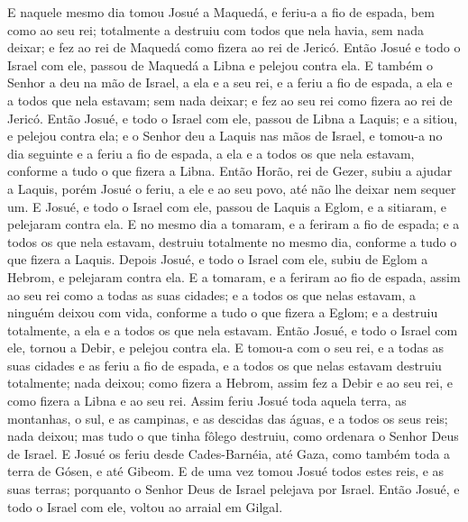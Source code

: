 E naquele mesmo dia tomou Josué a Maquedá, e feriu-a a fio de
espada, bem como ao seu rei; totalmente a destruiu com todos que
nela havia, sem nada deixar; e fez ao rei de Maquedá como fizera ao
rei de Jericó. Então Josué e todo o Israel com ele, passou de
Maquedá a Libna e pelejou contra ela. E também o Senhor a deu
na mão de Israel, a ela e a seu rei, e a feriu a fio de espada, a
ela e a todos que nela estavam; sem nada deixar; e fez ao seu rei
como fizera ao rei de Jericó. Então Josué, e todo o Israel
com ele, passou de Libna a Laquis; e a sitiou, e pelejou contra ela;
e o Senhor deu a Laquis nas mãos de Israel, e tomou-a no dia
seguinte e a feriu a fio de espada, a ela e a todos os que nela
estavam, conforme a tudo o que fizera a Libna. Então Horão,
rei de Gezer, subiu a ajudar a Laquis, porém Josué o feriu, a ele e
ao seu povo, até não lhe deixar nem sequer um. E Josué, e
todo o Israel com ele, passou de Laquis a Eglom, e a sitiaram, e
pelejaram contra ela. E no mesmo dia a tomaram, e a feriram a
fio de espada; e a todos os que nela estavam, destruiu totalmente no
mesmo dia, conforme a tudo o que fizera a Laquis. Depois
Josué, e todo o Israel com ele, subiu de Eglom a Hebrom, e pelejaram
contra ela. E a tomaram, e a feriram ao fio de espada, assim
ao seu rei como a todas as suas cidades; e a todos os que nelas
estavam, a ninguém deixou com vida, conforme a tudo o que fizera a
Eglom; e a destruiu totalmente, a ela e a todos os que nela estavam.
Então Josué, e todo o Israel com ele, tornou a Debir, e
pelejou contra ela. E tomou-a com o seu rei, e a todas as
suas cidades e as feriu a fio de espada, e a todos os que nelas
estavam destruiu totalmente; nada deixou; como fizera a Hebrom,
assim fez a Debir e ao seu rei, e como fizera a Libna e ao seu rei.
Assim feriu Josué toda aquela terra, as montanhas, o sul, e
as campinas, e as descidas das águas, e a todos os seus reis; nada
deixou; mas tudo o que tinha fôlego destruiu, como ordenara o Senhor
Deus de Israel. E Josué os feriu desde Cades-Barnéia, até
Gaza, como também toda a terra de Gósen, e até Gibeom. E de
uma vez tomou Josué todos estes reis, e as suas terras; porquanto o
Senhor Deus de Israel pelejava por Israel. Então Josué, e
todo o Israel com ele, voltou ao arraial em Gilgal.

\medskip

